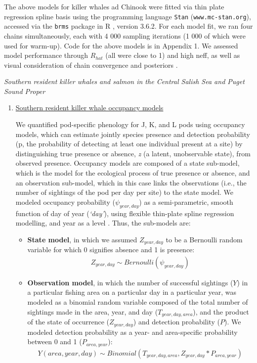 \documentclass{article}
\begin{document}
The above models for killer whales ad Chinook were fitted via thin plate regression spline basis using the programming language \texttt{Stan} \citep{Carpenter:2016aa} (\texttt{www.mc-stan.org}), accessed via the \texttt{brms}\citep{brms2018} package in R \citep{Rcore2019}, version 3.6.2. For each model fit, we ran four chains simultaneously, each with 4 000 sampling iterations (1 000 of which were used for warm-up). Code for the above models is in Appendix 1. We assessed model performance through $R_{hat}$ (all were close to 1) and high neff, as well as visual consideration of chain convergence and posteriors \citep{BDA}.
\par \emph{Southern resident killer whales and salmon in the Central Salish Sea and Puget Sound Proper}
\begin{enumerate}
\item \underline {Southern resident killer whale occupancy models}
\par We quantified pod-specific phenology for J, K, and L pods using occupancy models, which can estimate jointly species presence and detection probability (p, the probability of detecting at least one individual present at a site) by distinguishing true presence or absence, \emph{z} (a latent, unobservable state), from observed presence. Occupancy models are composed of a state sub-model, which is the model for the ecological process of true presence or absence, and an observation sub-model, which in this case links the observations (i.e., the number of sightings of the pod per day per site) to the state model. We modeled occupancy probability ($\psi_{year,day}$) as a semi-parametric, smooth function of day of year (\emph{`day'}), using flexible thin-plate spline regression modelling, and year as a level \citep{strebel2014}. Thus, the sub-models are:
\begin{itemize}

\item \textbf{State model}, in which we assumed $Z_{year,day}$ to be a Bernoulli random variable for which 0 signifies absence and 1 is presence:
 \begin{align*}
Z_{year,day} \sim Bernoulli (\psi_{year,day})
\end{align*}
  \item \textbf{Observation model}, in which the number of successful sightings ($Y$) in a particular fishing area on a particular day in a particular year, was modeled as a binomial random variable composed of the total number of sightings made in the area, year, and day ($T_{year,day,area}$), and the product of the state of occurrence ($Z_{year,day}$) and detection probability ($P$). We modeled detection probability as a year- and area-specific probability between 0 and 1 ($P_{area,year}$):
\begin{align*}
Y(area,year,day) \sim Binomial (T_{year, day,area},Z_{year,day}*P_{area,year})
\end{align*}
                                                                             \end{itemize}                                                       


\end{enumerate}
\end{document}
